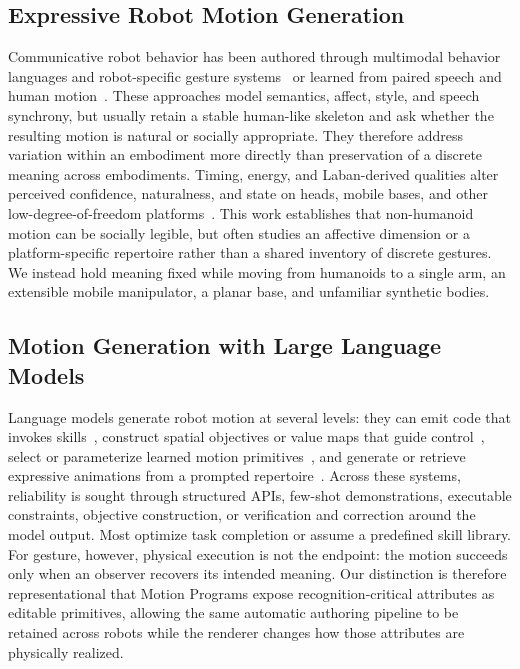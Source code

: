 \documentclass[letterpaper,10pt,conference]{ieeeconf}
\begin{document}
\subsection{Expressive Robot Motion Generation}
Communicative robot behavior has been authored through multimodal behavior languages and robot-specific gesture systems~\cite{kopp2006bml,salem2012gesture,chidambaram2012gesture} or learned from paired speech and human motion~\cite{kucherenko2020gesticulator,yoon2020trimodal,liu2022beat}.
These approaches model semantics, affect, style, and speech synchrony, but usually retain a stable human-like skeleton and ask whether the resulting motion is natural or socially appropriate.
They therefore address variation within an embodiment more directly than preservation of a discrete meaning across embodiments.
Timing, energy, and Laban-derived qualities alter perceived confidence, naturalness, and state on heads, mobile bases, and other low-degree-of-freedom platforms~\cite{zhou2017timing,knight2014xytheta,knight2016laban}.
This work establishes that non-humanoid motion can be socially legible, but often studies an affective dimension or a platform-specific repertoire rather than a shared inventory of discrete gestures.
We instead hold meaning fixed while moving from humanoids to a single arm, an extensible mobile manipulator, a planar base, and unfamiliar synthetic bodies.

\subsection{Motion Generation with Large Language Models}
Language models generate robot motion at several levels: they can emit code that invokes skills~\cite{liang2023cap}, construct spatial objectives or value maps that guide control~\cite{huang2023voxposer}, select or parameterize learned motion primitives~\cite{dai2026lmp}, and generate or retrieve expressive animations from a prompted repertoire~\cite{mahadevan2024generative}.
Across these systems, reliability is sought through structured APIs, few-shot demonstrations, executable constraints, objective construction, or verification and correction around the model output.
Most optimize task completion or assume a predefined skill library.
For gesture, however, physical execution is not the endpoint: the motion succeeds only when an observer recovers its intended meaning.
Our distinction is therefore representational that Motion Programs expose recognition-critical attributes as editable primitives, allowing the same automatic authoring pipeline to be retained across robots while the renderer changes how those attributes are physically realized.
\end{document}
